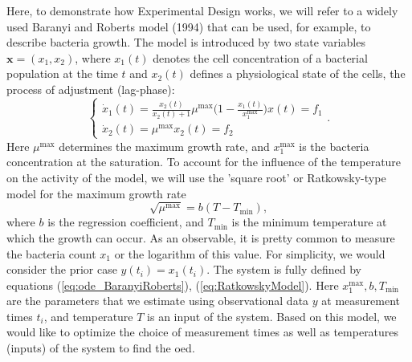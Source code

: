\documentclass[10pt,A4paper]{article}
\newcommand{\mbx}{\mathbf{x}}
\begin{document}
Here, to demonstrate how Experimental Design works, we will refer to a widely used Baranyi and Roberts model (1994) that can be used, for example, to describe bacteria growth.
The model is introduced by two state variables $\mbx = (x_1, x_2)$, where $x_1(t)$ denotes the cell concentration of a bacterial population at the time $t$ and $x_2(t)$ defines a physiological state of the cells, the process of adjustment (lag-phase):
\begin{equation}
    \begin{cases}
        \dot x_1(t) = \frac{x_2(t)}{x_2(t) + 1} \mu^\text{max} \big(1 - \frac{x_1(t)}{x_1^\text{max}}\big) x(t)  = f_1 \\
        \dot x_2(t) = \mu^\text{max}  x_2(t) = f_2
    \end{cases}.
    \label{eq:ode_BaranyiRoberts}
\end{equation}
Here $\mu^\text{max}$ determines the maximum growth rate, and $x_1^\text{max}$ is the bacteria concentration at the saturation. 
To account for the influence of the temperature on the activity of the model, we will use the 'square root' or Ratkowsky-type model for the maximum growth rate
\begin{equation}
    \sqrt{\mu^\text{max}} = b (T - T_\text{min}),
    \label{eq:RatkowskyModel}
\end{equation} 
where $b$ is the regression coefficient, and $T_\text{min}$ is the minimum temperature at which the growth can occur.
As an observable, it is pretty common to measure the bacteria count $x_1$ or the logarithm of this value. 
For simplicity, we would consider the prior case $y(t_i) = x_1(t_i)$.
The system is fully defined by equations (\ref{eq:ode_BaranyiRoberts}), (\ref{eq:RatkowskyModel}).
Here $x_1^\text{max}, b, T_\text{min}$ are the parameters that we estimate using observational data $y$ at measurement times $t_i$, and temperature $T$ is an input of the system.
Based on this model, we would like to optimize the choice of measurement times as well as temperatures (inputs) of the system to find the \acl{oed}.
%
\end{document}

